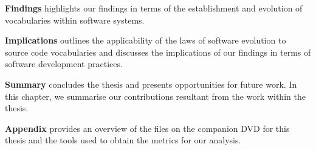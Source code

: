 \textbf{Findings} highlights our findings in terms of the establishment and evolution of vocabularies within software systems.

\textbf{Implications} outlines the applicability of the laws of software evolution to source code vocabularies and discusses the implications of our findings in terms of software development practices.

\textbf{Summary} concludes the thesis and presents opportunities for future work. In this chapter, we summarise our contributions resultant from the work within the thesis.

\textbf{Appendix} provides an overview of the files on the companion DVD for this thesis and the tools used to obtain the metrics for our analysis.


